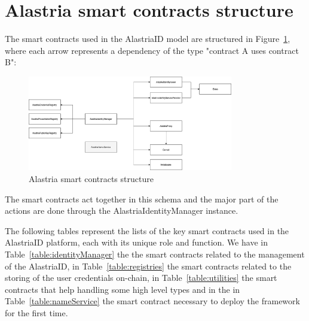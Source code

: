 \documentclass[target=mst,aauheader=]{thud}
\begin{document}
\section{Alastria smart contracts structure}

The smart contracts used in the AlastriaID model are structured in Figure~\ref{fig:alastriaSCStructure}, where each arrow represents a dependency of the type "contract A uses contract B":

\begin{figure}
    \centering
    \includegraphics[width=0.8\textwidth]{images/alastriaSmartContractsStructure.png}
    \caption{Alastria smart contracts structure}
    \label{fig:alastriaSCStructure}
\end{figure}

The smart contracts act together in this schema and the major part of the actions are done through the AlastriaIdentityManager instance.


The following tables represent the lists of the key smart contracts used in the AlastriaID platform, each with its unique role and function. We have in Table~\ref{table:identityManager} the the smart contracts related to the management of the AlastriaID, in Table~\ref{table:registries} the smart contracts related to the storing of the user credentials on-chain, in Table~\ref{table:utilities} the smart contracts that help handling some high level types and in the in Table~\ref{table:nameService} the smart contract necessary to deploy the framework for the first time.
\end{document}
